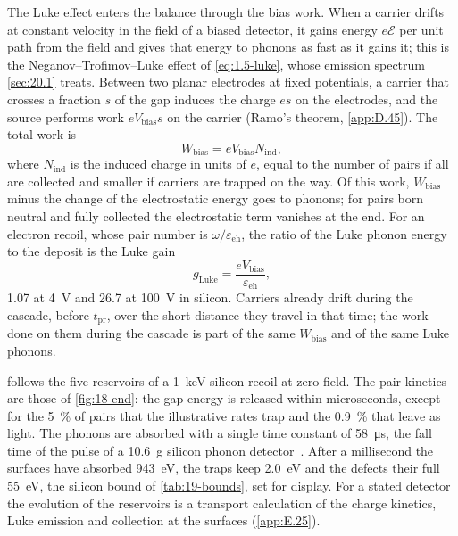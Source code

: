 The Luke effect enters the balance through the bias work. When a carrier drifts at constant velocity in the field of a biased detector, it gains energy $e\mathcal{E}$ per unit path from the field and gives that energy to phonons as fast as it gains it; this is the Neganov--Trofimov--Luke effect of \cref{eq:1.5-luke}, whose emission spectrum \cref{sec:20.1} treats. Between two planar electrodes at fixed potentials, a carrier that crosses a fraction $s$ of the gap induces the charge $es$ on the electrodes, and the source performs work $eV_{\mathrm{bias}}s$ on the carrier (Ramo's theorem, \cref{app:D.45}). The total work is
\begin{equation}
  W_{\mathrm{bias}} = eV_{\mathrm{bias}}N_{\mathrm{ind}} ,
  \label{eq:19.5-Wbias}
\end{equation}
where $N_{\mathrm{ind}}$ is the induced charge in units of $e$, equal to the number of pairs if all are collected and smaller if carriers are trapped on the way. Of this work, $W_{\mathrm{bias}}$ minus the change of the electrostatic energy goes to phonons; for pairs born neutral and fully collected the electrostatic term vanishes at the end. For an electron recoil, whose pair number is $\omega/\varepsilon_{\mathrm{eh}}$, the ratio of the Luke phonon energy to the deposit is the Luke gain
\begin{equation*}
  g_{\mathrm{Luke}} = \frac{eV_{\mathrm{bias}}}{\varepsilon_{\mathrm{eh}}} ,
\end{equation*}
1.07 at \SI{4}{V} and 26.7 at \SI{100}{V} in silicon. Carriers already drift during the cascade, before $t_{\mathrm{pr}}$, over the short distance they travel in that time; the work done on them during the cascade is part of the same $W_{\mathrm{bias}}$ and of the same Luke phonons.

 follows the five reservoirs of a \SI{1}{keV} silicon recoil at zero field. The pair kinetics are those of \cref{fig:18-end}: the gap energy is released within microseconds, except for the \SI{5}{\percent} of pairs that the illustrative rates trap and the \SI{0.9}{\percent} that leave as light. The phonons are absorbed with a single time constant of \SI{58}{\micro s}, the fall time of the pulse of a \SI{10.6}{g} silicon phonon detector~\cite[p.~2]{alkhatib2021light}. After a millisecond the surfaces have absorbed \SI{943}{eV}, the traps keep \SI{2.0}{eV} and the defects their full \SI{55}{eV}, the silicon bound of \cref{tab:19-bounds}, set for display. For a stated detector the evolution of the reservoirs is a transport calculation of the charge kinetics, Luke emission and collection at the surfaces (\cref{app:E.25}).

